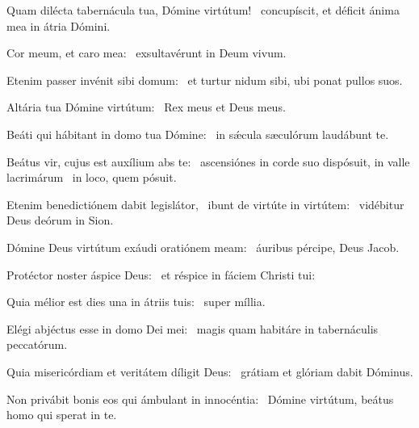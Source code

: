\item Quam dilécta tabernácula tua, Dómine virtútum!~\psstar{} concupíscit, et déficit ánima mea in átria Dómini.

\item Cor meum, et caro mea:~\psstar{} exsultavérunt in Deum vivum.

\item Etenim passer invénit sibi domum:~\psstar{} et turtur nidum sibi, ubi ponat pullos suos.

\item Altária tua Dómine virtú\-tum:~\psstar{} Rex meus et Deus meus.

\item Beáti qui hábitant in domo tua Dómine:~\psstar{} in sǽcula sæculórum laudábunt te.

\item Beátus vir, cujus est auxílium abs te:~\pscross{} ascensiónes in corde suo dispósuit, in valle lacrimárum~\psstar{} in loco, quem pósuit.

\item Etenim benedictiónem dabit legislátor,~\pscross{} ibunt de virtúte in virtútem:~\psstar{} vidébitur Deus deórum in Sion.

\item Dómine Deus virtútum exáudi oratiónem meam:~\psstar{} áuribus pércipe, Deus Jacob.

\item Protéctor noster áspice Deus:~\psstar{} et réspice in fáciem Christi tui:

\item Quia mélior est dies una in átriis tuis:~\psstar{} super míllia.

\item Elégi abjéctus esse in domo Dei mei:~\psstar{} magis quam habitáre in tabernáculis peccatórum.

\item Quia misericórdiam et veritátem díligit Deus:~\psstar{} grátiam et glóriam dabit Dóminus.

\item Non privábit bonis eos qui ámbulant in innocéntia:~\psstar{} Dómine virtútum, beátus homo qui sperat in te.

